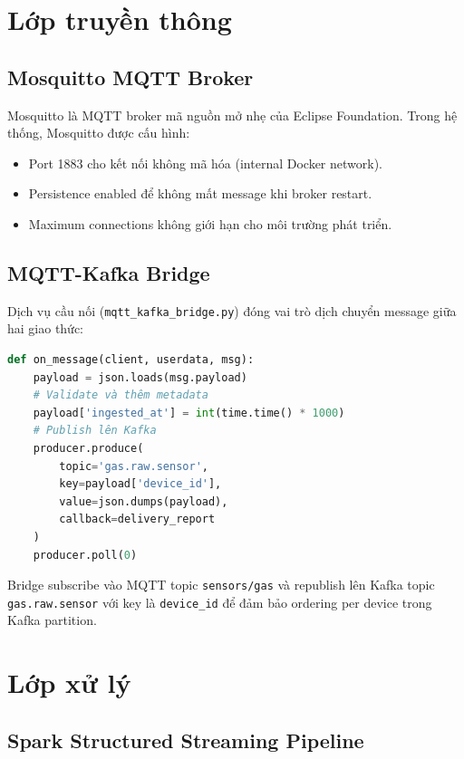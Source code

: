 \section{Lớp truyền thông}

\subsection{Mosquitto MQTT Broker}

Mosquitto là MQTT broker mã nguồn mở nhẹ của Eclipse Foundation. Trong hệ thống, Mosquitto được cấu hình:
\begin{itemize}
  \item Port 1883 cho kết nối không mã hóa (internal Docker network).
  \item Persistence enabled để không mất message khi broker restart.
  \item Maximum connections không giới hạn cho môi trường phát triển.
\end{itemize}

\subsection{MQTT-Kafka Bridge}

Dịch vụ cầu nối (\texttt{mqtt\_kafka\_bridge.py}) đóng vai trò dịch chuyển message giữa hai giao thức:

\begin{lstlisting}[language=Python, caption={Logic bridge đơn giản hóa}]
def on_message(client, userdata, msg):
    payload = json.loads(msg.payload)
    # Validate và thêm metadata
    payload['ingested_at'] = int(time.time() * 1000)
    # Publish lên Kafka
    producer.produce(
        topic='gas.raw.sensor',
        key=payload['device_id'],
        value=json.dumps(payload),
        callback=delivery_report
    )
    producer.poll(0)
\end{lstlisting}

Bridge subscribe vào MQTT topic \texttt{sensors/gas} và republish lên Kafka topic \texttt{gas.raw.sensor} với key là \texttt{device\_id} để đảm bảo ordering per device trong Kafka partition.

\section{Lớp xử lý}

\subsection{Spark Structured Streaming Pipeline}


